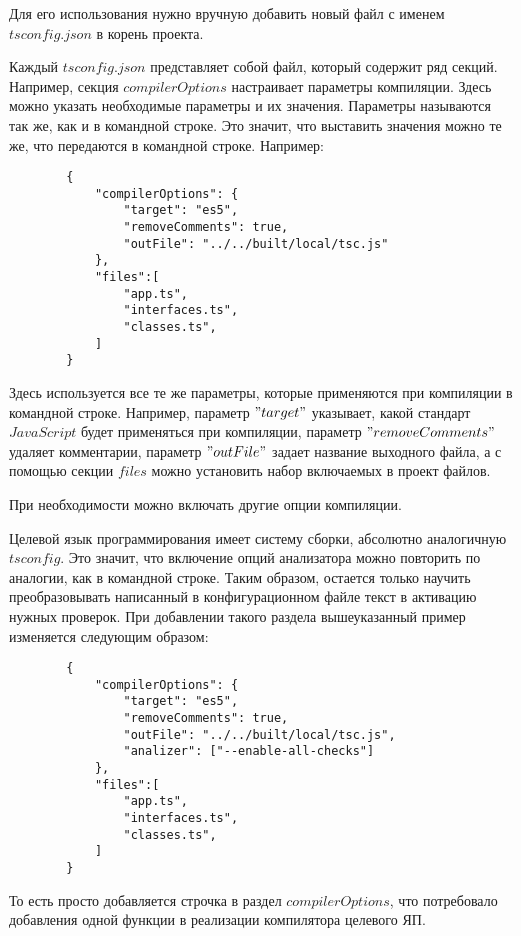 \documentclass{mipt-thesis-bs}
\begin{document}
Для его использования нужно вручную добавить новый файл с именем $tsconfig.json$ в корень проекта.


Каждый $tsconfig.json$ представляет собой файл, который содержит ряд секций. 
Например, секция $compilerOptions$ настраивает параметры компиляции. 
Здесь можно указать необходимые параметры и их значения. 
Параметры называются так же, как и в командной строке. 
Это значит, что выставить значения можно те же, что передаются в командной строке. Например:

\begin{verbatim}
        {
            "compilerOptions": {
                "target": "es5",
                "removeComments": true,
                "outFile": "../../built/local/tsc.js"
            },
            "files":[
                "app.ts",
                "interfaces.ts",
                "classes.ts",
            ]
        }
\end{verbatim}

Здесь используется все те же параметры, которые применяются при компиляции в 
командной строке. Например, параметр $"target"$ 
указывает, какой стандарт $JavaScript$ будет применяться при компиляции, параметр 
$"removeComments"$ удаляет комментарии, параметр $"outFile"$ задает название выходного файла, а 
с помощью секции $files$ можно установить набор включаемых в проект файлов.

При необходимости можно включать другие опции компиляции.

Целевой язык программирования имеет систему сборки, абсолютно аналогичную $tsconfig$. Это значит, 
что включение опций анализатора можно повторить по аналогии, как в командной строке. Таким образом, 
остается только научить преобразовывать написанный в конфигурационном файле текст в активацию 
нужных проверок. При добавлении такого раздела вышеуказанный пример изменяется 
следующим образом:

\begin{verbatim}
        {
            "compilerOptions": {
                "target": "es5",
                "removeComments": true,
                "outFile": "../../built/local/tsc.js",
                "analizer": ["--enable-all-checks"]
            },
            "files":[
                "app.ts",
                "interfaces.ts",
                "classes.ts",
            ]
        }
\end{verbatim}

То есть просто добавляется строчка в раздел $compilerOptions$, что потребовало добавления 
одной функции в реализации компилятора целевого ЯП.
\end{document}
